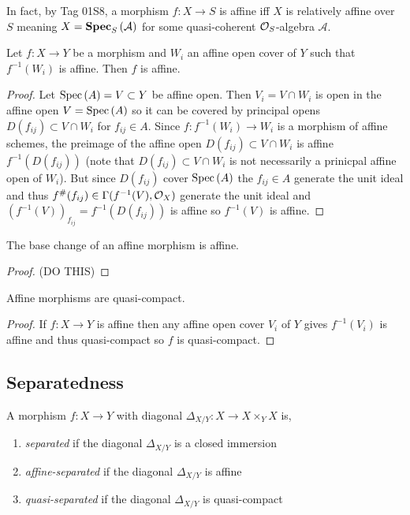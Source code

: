 \documentclass[12pt]{article}
\begin{document}
\begin{rmk}
In fact, by Tag 01S8, a morphism $f : X \to S$ is affine iff $X$ is relatively affine over $S$ meaning $X = \mathbf{Spec}_{S}\left( \mathcal{A} \right)$ for some quasi-coherent $\mathcal{O}_{S}$-algebra $\mathcal{A}$. 
\end{rmk}

\begin{lemma}
Let $f : X \to Y$ be a morphism and $W_i$ an affine open cover of $Y$ such that $f^{-1}(W_i)$ is affine. Then $f$ is affine.
\end{lemma}

\begin{proof}
Let $\mathrm{Spec}\left( A \right) = V \subset Y$ be affine open. Then $V_i = V \cap W_i$ is open in the affine open $V = \mathrm{Spec}\left( A \right)$ so it can be covered by principal opens $D(f_{ij}) \subset V \cap W_i$ for $f_{ij} \in A$. Since $f : f^{-1}(W_i) \to W_i$ is a morphism of affine schemes, the preimage of the affine open $D(f_{ij}) \subset V \cap W_i$ is affine $f^{-1}(D(f_{ij}))$ (note that $D(f_{ij}) \subset V \cap W_i$ is not necessarily a prinicpal affine open of $W_i$). But since $D(f_{ij})$ cover $\mathrm{Spec}\left( A \right)$ the $f_{ij} \in A$ generate the unit ideal and thus $f^\#(f_{ij}) \in \Gamma(f^{-1}(V), \mathcal{O}_{X})$ generate the unit ideal and $(f^{-1}(V))_{f_{ij}} = f^{-1}(D(f_{ij}))$ is affine so $f^{-1}(V)$ is affine.
\end{proof}

\begin{lemma}
The base change of an affine morphism is affine. 
\end{lemma}

\begin{proof}
(DO THIS)
\end{proof}


\begin{lemma}
Affine morphisms are quasi-compact.
\end{lemma}

\begin{proof}
If $f : X \to Y$ is affine then any affine open cover $V_i$ of $Y$ gives $f^{-1}(V_i)$ is affine and thus quasi-compact so $f$ is quasi-compact. 
\end{proof}

\subsection{Separatedness}

\begin{defn}
A morphism $f : X \to Y$ with diagonal $\Delta_{X/Y} : X \to X \times_Y X$ is,
\begin{enumerate}
\item \textit{separated} if the diagonal $\Delta_{X/Y}$ is a closed immersion
\item \textit{affine-separated} if the diagonal $\Delta_{X/Y}$ is affine
\item \textit{quasi-separated} if the diagonal $\Delta_{X/Y}$ is quasi-compact
\end{enumerate}
\end{defn}
\end{document}
